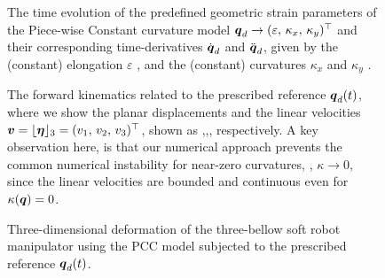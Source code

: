 \begin{figure}[!t]
  \vspace{-5mm}
  
  \vspace{-3mm}
  \caption{The time evolution of the predefined geometric strain parameters of the Piece-wise Constant curvature model ${\boldsymbol{q}}_d \to  (\varepsilon, \, \kappa_x,\,\kappa_y)^\top$ and their corresponding time-derivatives ${\dot{\boldsymbol{q}}}_d$ and ${\ddot{\boldsymbol{q}}}_d$, given by the (constant) elongation $\varepsilon$ , and the (constant) curvatures $\kappa_x$  and $\kappa_y$ .}
  \label{fig:C2:EX1:strain_ref}
\end{figure}

\vfill

\begin{figure}[!t]
  \vspace{-3mm}
  
  \vspace{-3mm}
  \caption{The forward kinematics related to the prescribed reference ${\boldsymbol{q}}_d(t)$, where we show the planar displacements  and the linear velocities $\boldsymbol{v} = \lfloor{\boldsymbol{\eta}}\rfloor_3 = (v_1,\,v_2,\,v_3)^\top$, shown as ,,, respectively.  A key observation here, is that our numerical approach prevents the common numerical instability for near-zero curvatures, \ie, $\kappa \to 0$, since the linear velocities are bounded and continuous even for $\kappa({\boldsymbol{q}}) = 0$. }
  \label{fig:C2:EX1:strain_ref_FK}
\end{figure}
%
\newpage
\begin{figure}[!t]
 \vspace{-3mm}
  \centering
  
  \caption{Three-dimensional deformation of the three-bellow soft robot manipulator using the PCC model subjected to the prescribed reference ${\boldsymbol{q}}_d(t)$.}
  \vspace{-0.1cm}
  \label{fig:C2:EX1:strain_ref_3D}
\end{figure}
%
\vfill
\clearpage

